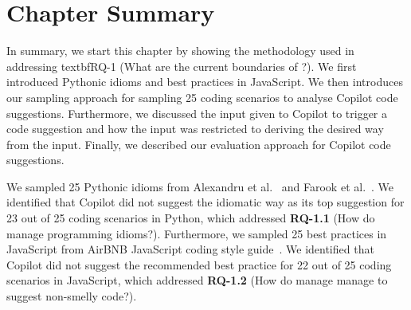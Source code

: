 \section{Chapter Summary}
In summary, we start this chapter by showing the methodology used in addressing textbf{RQ-1} (What are the current boundaries of \cct{}?). 
We first introduced Pythonic idioms and best practices in JavaScript.
We then introduces our sampling approach for sampling 25 coding scenarios to analyse Copilot code suggestions.
Furthermore, we discussed the input given to Copilot to trigger a code suggestion 
and how the input was restricted to deriving the desired way from the input.
Finally, we described our evaluation approach for Copilot code suggestions.

We sampled 25 Pythonic idioms from Alexandru et al.~\cite{Alexandru2018} and Farook et al.~\cite{idioms}.
We identified that Copilot did not suggest the idiomatic way as its top suggestion for 23 out of 25 coding scenarios in Python, which addressed \textbf{RQ-1.1} (How do \cct{} manage programming idioms?).
Furthermore, we sampled 25 best practices in JavaScript from AirBNB JavaScript coding style guide~\cite{airbnb_code}. We identified that Copilot did not suggest the recommended best practice for 22 out of 25 coding scenarios in JavaScript, which addressed \textbf{RQ-1.2} (How do \cct{} manage manage to suggest non-smelly code?).




